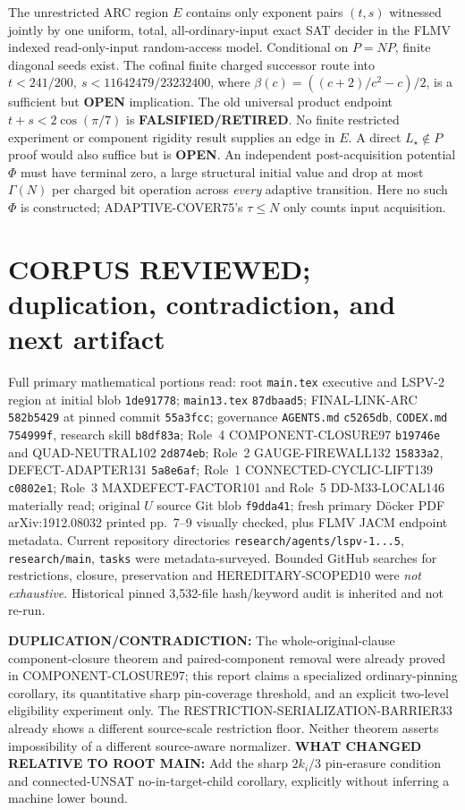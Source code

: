 \documentclass[11pt]{article}
\begin{document}
\noindent The unrestricted ARC region \(E\) contains only exponent pairs \((t,s)\) witnessed jointly by one uniform, total, all-ordinary-input exact SAT decider in the FLMV indexed read-only-input random-access model. Conditional on \(P=NP\), finite diagonal seeds exist. The cofinal finite charged successor route into \(t<241/200,\ s<11642479/23232400\), where \(\beta(c)=((c+2)/c^2-c)/2\), is a sufficient but \textbf{OPEN} implication. The old universal product endpoint \(t+s<2\cos(\pi/7)\) is \textbf{FALSIFIED/RETIRED}. No finite restricted experiment or component rigidity result supplies an edge in \(E\). A direct \(L_\star\notin P\) proof would also suffice but is \textbf{OPEN}. An independent post-acquisition potential \(\Phi\) must have terminal zero, a large structural initial value and drop at most \(\Gamma(N)\) per charged bit operation across \emph{every} adaptive transition. Here no such \(\Phi\) is constructed; ADAPTIVE-COVER75's \(\tau\le N\) only counts input acquisition.

\section{CORPUS REVIEWED; duplication, contradiction, and next artifact}
\noindent Full primary mathematical portions read: root \texttt{main.tex} executive and LSPV-2 region at initial blob \texttt{1de91778}; \texttt{main13.tex} \texttt{87dbaad5}; FINAL-LINK-ARC \texttt{582b5429} at pinned commit \texttt{55a3fcc}; governance \texttt{AGENTS.md} \texttt{c5265db}, \texttt{CODEX.md} \texttt{754999f}, research skill \texttt{b8df83a}; Role~4 COMPONENT-CLOSURE97 \texttt{b19746e} and QUAD-NEUTRAL102 \texttt{2d874eb}; Role~2 GAUGE-FIREWALL132 \texttt{15833a2}, DEFECT-ADAPTER131 \texttt{5a8e6af}; Role~1 CONNECTED-CYCLIC-LIFT139 \texttt{c0802e1}; Role~3 MAXDEFECT-FACTOR101 and Role~5 DD-M33-LOCAL146 materially read; original \(U\) source Git blob \texttt{f9dda41}; fresh primary D\"ocker PDF arXiv:1912.08032 printed pp.~7--9 visually checked, plus FLMV JACM endpoint metadata. Current repository directories \texttt{research/agents/lspv-1...5}, \texttt{research/main}, \texttt{tasks} were metadata-surveyed. Bounded GitHub searches for restrictions, closure, preservation and HEREDITARY-SCOPED10 were \emph{not exhaustive}. Historical pinned 3,532-file hash/keyword audit is inherited and not re-run.

\noindent \textbf{DUPLICATION/CONTRADICTION:} The whole-original-clause component-closure theorem and paired-component removal were already proved in COMPONENT-CLOSURE97; this report claims a specialized ordinary-pinning corollary, its quantitative sharp pin-coverage threshold, and an explicit two-level eligibility experiment only. The RESTRICTION-SERIALIZATION-BARRIER33 already shows a different source-scale restriction floor. Neither theorem asserts impossibility of a different source-aware normalizer. \textbf{WHAT CHANGED RELATIVE TO ROOT MAIN:} Add the sharp \(2k_i/3\) pin-erasure condition and connected-UNSAT no-in-target-child corollary, explicitly without inferring a machine lower bound.
\end{document}
